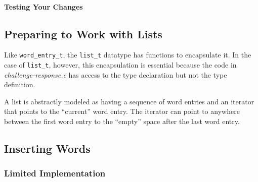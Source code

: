     \paragraph{Testing Your Changes}

        \begin{description}
        \end{description}


\subsection{Preparing to Work with Lists}

    Like \lstinline{word_entry_t}, the \lstinline{list_t} datatype has functions to encapsulate it.
    In the case of \lstinline{list_t}, however, this encapsulation is essential because the code in \textit{challenge-response.c} has access to the type declaration but not the type definition.

    \begin{description}
    \end{description}

    A list is abstractly modeled as having a sequence of word entries and an iterator that points to the ``current'' word entry.
    The iterator can point to anywhere between the first word entry to the ``empty'' space after the last word entry.

    \begin{description}
    \end{description}


\subsection{Inserting Words}

    \subsubsection{Limited Implementation}

